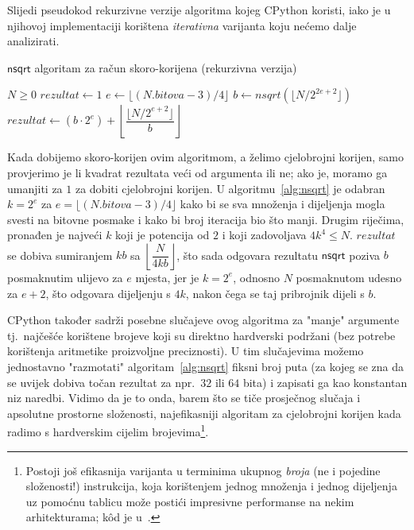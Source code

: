 \documentclass[12pt]{scrartcl}
\begin{document}
Slijedi pseudokod rekurzivne verzije algoritma kojeg CPython koristi, iako je u njihovoj implementaciji korištena \emph{iterativna} varijanta koju nećemo
dalje analizirati.
\begin{algorithm}
    \caption{$\mathsf{nsqrt}$ algoritam za račun skoro-korijena (rekurzivna verzija)~\cite{mdickpaper}}\label{alg:nsqrt}
    \begin{algorithmic}[1]
    \Require $N \geq 0$
        \State $rezultat \gets 1$
    \Else
        \State $e \gets \lfloor(N.bitova - 3) / 4\rfloor$
        \State $b \gets nsqrt(\lfloor N / 2^{2e+2}\rfloor)$
        \State $rezultat \gets (b \cdot 2^e) + \left\lfloor \dfrac{\lfloor N / 2^{e+2}\rfloor}{b}\right\rfloor$
    \EndIf
    \end{algorithmic}
\end{algorithm}
Kada dobijemo skoro-korijen ovim algoritmom, a želimo cjelobrojni korijen, samo provjerimo je li kvadrat rezultata veći od argumenta ili ne;
ako je, moramo ga umanjiti za $1$ za dobiti cjelobrojni korijen.
U algoritmu~\ref{alg:nsqrt} je odabran $k=2^e$ za $e=\lfloor(N.bitova - 3) / 4\rfloor$ kako bi se sva množenja i dijeljenja mogla svesti
na bitovne posmake i kako bi broj iteracija bio što manji. Drugim riječima, pronađen je najveći $k$ koji je potencija od $2$ i koji
zadovoljava $4k^4 \leq N$. $rezultat$ se dobiva sumiranjem $kb$ sa $\left\lfloor\dfrac{N}{4kb}\right\rfloor$, što sada odgovara rezultatu
$\mathsf{nsqrt}$ poziva $b$ posmaknutim ulijevo za $e$ mjesta, jer je $k=2^e$, odnosno $N$ posmaknutom udesno za $e+2$, što odgovara
dijeljenju s $4k$, nakon čega se taj pribrojnik dijeli s $b$.

CPython također sadrži posebne slučajeve ovog algoritma za "manje" argumente tj.\ najčešće korištene brojeve koji su direktno hardverski
podržani (bez potrebe korištenja aritmetike proizvoljne preciznosti). U tim slučajevima možemo jednostavno "razmotati" algoritam~\ref{alg:nsqrt} fiksni
broj puta (za kojeg se zna da se uvijek dobiva točan rezultat za npr.\ $32$ ili $64$ bita) i zapisati ga kao konstantan niz naredbi. Vidimo da je to onda,
barem što se tiče prosječnog slučaja i apsolutne prostorne složenosti, najefikasniji algoritam za cjelobrojni korijen kada radimo s hardverskim
cijelim brojevima\footnote{Postoji još efikasnija varijanta u terminima ukupnog \emph{broja} (ne i pojedine složenosti!) instrukcija, koja korištenjem jednog
množenja i jednog
dijeljenja uz pomoćnu tablicu može postići impresivne performanse na nekim arhitekturama; k\^od je u~\cite{mdickpaper}.}.
\end{document}

